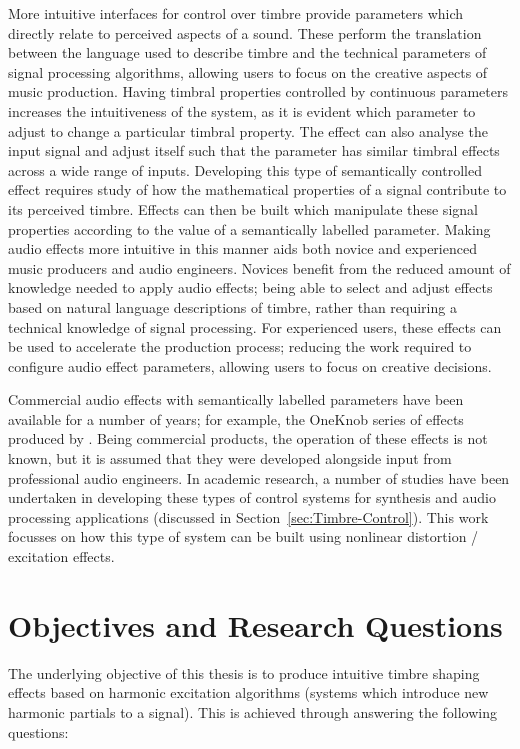 	More intuitive interfaces for control over timbre provide parameters which directly relate to perceived aspects of a
	sound. These perform the translation between the language used to describe timbre and the technical parameters of
	signal processing algorithms, allowing users to focus on the creative aspects of music production. Having timbral
	properties controlled by continuous parameters increases the intuitiveness of the system, as it is evident which
	parameter to adjust to change a particular timbral property. The effect can also analyse the input signal and adjust
	itself such that the parameter has similar timbral effects across a wide range of inputs. Developing this type of
	semantically controlled effect requires study of how the mathematical properties of a signal contribute to its
	perceived timbre. Effects can then be built which manipulate these signal properties according to the value of a
	semantically labelled parameter. Making audio effects more intuitive in this manner aids both novice and experienced
	music producers and audio engineers. Novices benefit from the reduced amount of knowledge needed to apply audio
	effects; being able to select and adjust effects based on natural language descriptions of timbre, rather than
	requiring a technical knowledge of signal processing. For experienced users, these effects can be used to accelerate
	the production process; reducing the work required to configure audio effect parameters, allowing users to focus on
	creative decisions. 
	
	Commercial audio effects with semantically labelled parameters have been available for a number of years; for
	example, the OneKnob series of effects produced by \citet{wavesoneknob}. Being commercial products, the operation of
	these effects is not known, but it is assumed that they were developed alongside input from professional audio
	engineers. In academic research, a number of studies have been undertaken in developing these types of control
	systems for synthesis and audio processing applications (discussed in Section~\ref{sec:Timbre-Control}). This work
	focusses on how this type of system can be built using nonlinear distortion / excitation effects.

\section{Objectives and Research Questions}
\label{sec:Introduction-Objectives}
	The underlying objective of this thesis is to produce intuitive timbre shaping effects based on harmonic excitation
	algorithms (systems which introduce new harmonic partials to a signal). This is achieved through answering the
	following questions:

